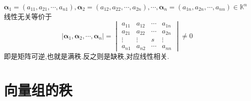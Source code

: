 \begin{green}
\begin{corollary}[向量组线性关系的行列式判断]\label{cor:向量组线性关系的行列式判断}
    $\bm{\alpha}_1 = \left(a_{11},a_{21},
    \cdots,a_{n1}\right),\bm{\alpha}_2=
    \left(a_{12},a_{22},\cdots,a_{2n}\right),\cdots,\bm{\alpha}_n
    =\left(a_{1n},a_{2n},\cdots,a_{nn}\right)
    \in \mathbb{K}^n$线性无关等价于
    \[
    \left|\bm{\alpha}_1,\bm{\alpha}_2,\cdots
    ,\bm{\alpha}_n\right|=
    \begin{vmatrix}
        a_{11} & a_{12} & \cdots & a_{1n} \\
        a_{21} & a_{22} & \cdots & a_{2n} \\
        \vdots & \vdots & s & \vdots \\
        a_{n1} & a_{n2} & \cdots & a_{nn}
    \end{vmatrix}
    \neq 0
    \]
    即是矩阵可逆,也就是满秩.反之则是缺秩,对应线性相关.
\end{corollary}
\end{green}
\newpage
\section{向量组的秩}
